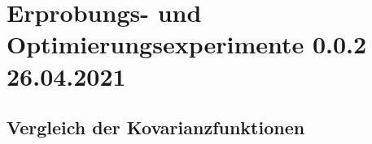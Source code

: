 %

\chapter{Erprobungs- und Optimierungsexperimente 0.0.2 26.04.2021}\label{ch:erprobungs-u-opt-exp}
	
	
\section{Vergleich der Kovarianzfunktionen}\label{sec:vgl-kfun-exp}



	
%
%
%
%
%
